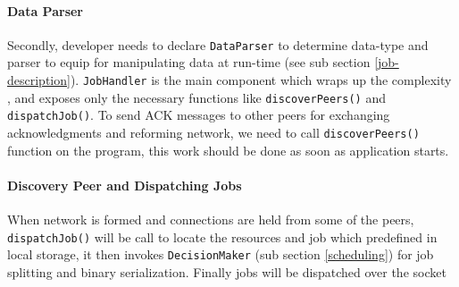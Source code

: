\documentclass[conference]{IEEEtran}
\begin{document}
\paragraph{Data Parser}

Secondly, developer needs to declare \texttt{DataParser} to determine data-type and parser to equip for manipulating data at run-time (see sub section \ref{job-description}). \texttt{JobHandler} is the main component which wraps up the complexity , and exposes only the necessary functions like \texttt{discoverPeers()} and \texttt{dispatchJob()}. To send ACK messages to other peers for exchanging acknowledgments and reforming network, we need to call \texttt{discoverPeers()} function on the program, this work should be done as soon as application starts.\\

\noindent {}	

\paragraph{Discovery Peer and Dispatching Jobs}

When network is formed and connections are held from some of the peers, \texttt{dispatchJob()} will be call to locate the resources and job which predefined in local storage, it then invokes \texttt{DecisionMaker} (sub section \ref{scheduling}) for job splitting and binary serialization. Finally jobs will be dispatched over the socket\\

\noindent {}
\end{document}

